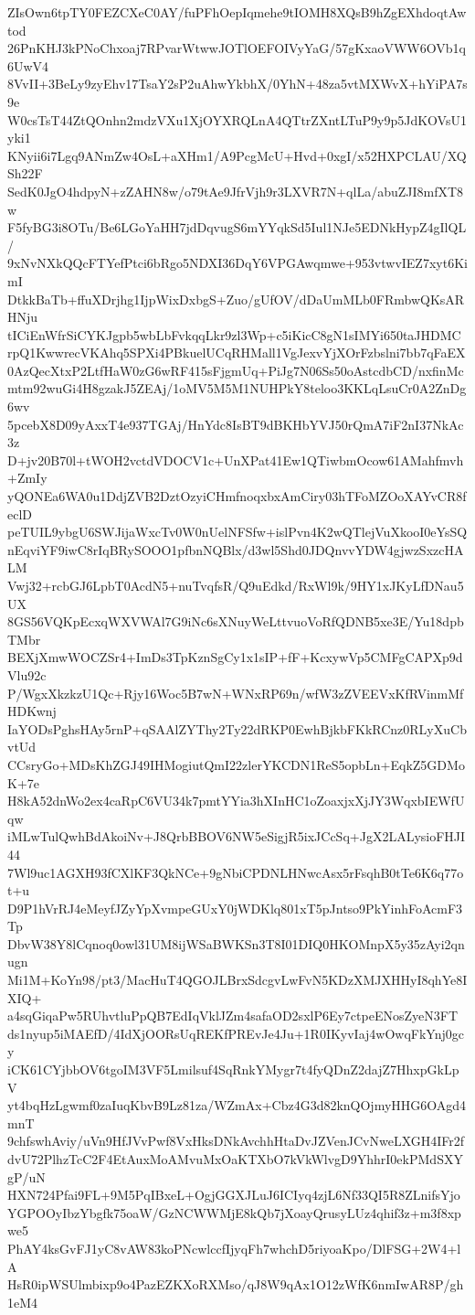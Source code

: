 ZIsOwn6tpTY0FEZCXeC0AY/fuPFhOepIqmehe9tIOMH8XQsB9hZgEXhdoqtAwtod
26PnKHJ3kPNoChxoaj7RPvarWtwwJOTlOEFOIVyYaG/57gKxaoVWW6OVb1q6UwV4
8VvII+3BeLy9zyEhv17TsaY2sP2uAhwYkbhX/0YhN+48za5vtMXWvX+hYiPA7s9e
W0csTsT44ZtQOnhn2mdzVXu1XjOYXRQLnA4QTtrZXntLTuP9y9p5JdKOVsU1yki1
KNyii6i7Lgq9ANmZw4OsL+aXHm1/A9PcgMcU+Hvd+0xgI/x52HXPCLAU/XQSh22F
SedK0JgO4hdpyN+zZAHN8w/o79tAe9JfrVjh9r3LXVR7N+qlLa/abuZJI8mfXT8w
F5fyBG3i8OTu/Be6LGoYaHH7jdDqvugS6mYYqkSd5Iul1NJe5EDNkHypZ4gIlQL/
9xNvNXkQQcFTYefPtci6bRgo5NDXI36DqY6VPGAwqmwe+953vtwvIEZ7xyt6KimI
DtkkBaTb+ffuXDrjhg1IjpWixDxbgS+Zuo/gUfOV/dDaUmMLb0FRmbwQKsARHNju
tICiEnWfrSiCYKJgpb5wbLbFvkqqLkr9zl3Wp+c5iKicC8gN1sIMYi650taJHDMC
rpQ1KwwrecVKAhq5SPXi4PBkuelUCqRHMall1VgJexvYjXOrFzbslni7bb7qFaEX
0AzQecXtxP2LtfHaW0zG6wRF415sFjgmUq+PiJg7N06Ss50oAstcdbCD/nxfinMc
mtm92wuGi4H8gzakJ5ZEAj/1oMV5M5M1NUHPkY8teloo3KKLqLsuCr0A2ZnDg6wv
5pcebX8D09yAxxT4e937TGAj/HnYdc8IsBT9dBKHbYVJ50rQmA7iF2nI37NkAc3z
D+jv20B70l+tWOH2vctdVDOCV1c+UnXPat41Ew1QTiwbmOcow61AMahfmvh+ZmIy
yQONEa6WA0u1DdjZVB2DztOzyiCHmfnoqxbxAmCiry03hTFoMZOoXAYvCR8feclD
peTUIL9ybgU6SWJijaWxcTv0W0nUelNFSfw+islPvn4K2wQTlejVuXkooI0eYsSQ
nEqviYF9iwC8rIqBRySOOO1pfbnNQBlx/d3wl5Shd0JDQnvvYDW4gjwzSxzcHALM
Vwj32+rcbGJ6LpbT0AcdN5+nuTvqfsR/Q9uEdkd/RxWl9k/9HY1xJKyLfDNau5UX
8GS56VQKpEcxqWXVWAl7G9iNc6sXNuyWeLttvuoVoRfQDNB5xe3E/Yu18dpbTMbr
BEXjXmwWOCZSr4+ImDs3TpKznSgCy1x1sIP+fF+KcxywVp5CMFgCAPXp9dVlu92c
P/WgxXkzkzU1Qc+Rjy16Woc5B7wN+WNxRP69n/wfW3zZVEEVxKfRVinmMfHDKwnj
IaYODsPghsHAy5rnP+qSAAlZYThy2Ty22dRKP0EwhBjkbFKkRCnz0RLyXuCbvtUd
CCsryGo+MDsKhZGJ49IHMogiutQmI22zlerYKCDN1ReS5opbLn+EqkZ5GDMoK+7e
H8kA52dnWo2ex4caRpC6VU34k7pmtYYia3hXInHC1oZoaxjxXjJY3WqxbIEWfUqw
iMLwTulQwhBdAkoiNv+J8QrbBBOV6NW5eSigjR5ixJCcSq+JgX2LALysioFHJI44
7Wl9uc1AGXH93fCXlKF3QkNCe+9gNbiCPDNLHNwcAsx5rFsqhB0tTe6K6q77ot+u
D9P1hVrRJ4eMeyfJZyYpXvmpeGUxY0jWDKlq801xT5pJntso9PkYinhFoAcmF3Tp
DbvW38Y8lCqnoq0owl31UM8ijWSaBWKSn3T8I01DIQ0HKOMnpX5y35zAyi2qnugn
Mi1M+KoYn98/pt3/MacHuT4QGOJLBrxSdcgvLwFvN5KDzXMJXHHyI8qhYe8IXIQ+
a4sqGiqaPw5RUhvtluPpQB7EdIqVklJZm4safaOD2sxlP6Ey7ctpeENosZyeN3FT
ds1nyup5iMAEfD/4IdXjOORsUqREKfPREvJe4Ju+1R0IKyvIaj4wOwqFkYnj0gcy
iCK61CYjbbOV6tgoIM3VF5Lmilsuf4SqRnkYMygr7t4fyQDnZ2dajZ7HhxpGkLpV
yt4bqHzLgwmf0zaIuqKbvB9Lz81za/WZmAx+Cbz4G3d82knQOjmyHHG6OAgd4mnT
9chfswhAviy/uVn9HfJVvPwf8VxHksDNkAvchhHtaDvJZVenJCvNweLXGH4IFr2f
dvU72PlhzTcC2F4EtAuxMoAMvuMxOaKTXbO7kVkWlvgD9YhhrI0ekPMdSXYgP/uN
HXN724Pfai9FL+9M5PqIBxeL+OgjGGXJLuJ6ICIyq4zjL6Nf33QI5R8ZLnifsYjo
YGPOOyIbzYbgfk75oaW/GzNCWWMjE8kQb7jXoayQrusyLUz4qhif3z+m3f8xpwe5
PhAY4ksGvFJ1yC8vAW83koPNcwlccfIjyqFh7whchD5riyoaKpo/DlFSG+2W4+lA
HsR0ipWSUlmbixp9o4PazEZKXoRXMso/qJ8W9qAx1O12zWfK6nmIwAR8P/gh1eM4
